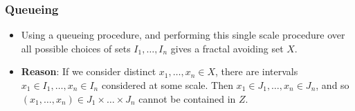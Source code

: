\documentclass[usenames,dvipsnames]{beamer}
\begin{document}
\begin{frame}
    \frametitle{Queueing}

    \begin{itemize}
        \item Using a queueing procedure, and performing this single scale procedure over all possible choices of sets $I_1, \dots, I_n$ gives a fractal avoiding set $X$.

        \item {\bf Reason}: If we consider distinct $x_1, \dots, x_n \in X$, there are intervals $x_1 \in I_1, \dots, x_n \in I_n$ considered at some scale. Then $x_1 \in J_1, \dots, x_n \in J_n$, and so $(x_1, \dots, x_n) \in J_1 \times \dots \times J_n$ cannot be contained in $Z$.
    \end{itemize}
\end{frame}
\end{document}
